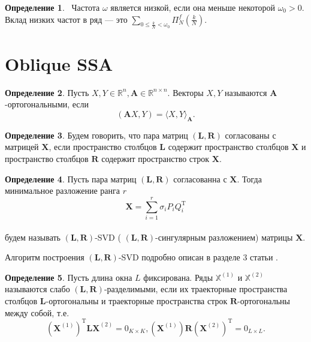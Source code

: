 \documentclass[specialist,
               substylefile = spbu_report.rtx,
               subf,href,colorlinks=true, 12pt]{disser}
\theoremstyle{definition}
\newtheorem{definition}{Определение}
\begin{document}
\begin{definition}
    ~Частота $\omega$ является низкой, если она меньше некоторой $\omega_0 > 0$. Вклад низких частот в ряд --- это $\sum\limits_{0 \leq \frac{k}{N} < \omega_0}\Pi_N^f(\frac{k}{N})$.
\end{definition}

\section{Oblique SSA}

\begin{definition}
    Пусть $X, Y \in \mathbb{R}^n, \mathbf{A} \in \mathbb{R}^{n \times n}$. Векторы $X, Y$ называются $\mathbf{A}$-ортогональными, если
    \begin{equation*}
        (\mathbf{A}X, Y) =  \langle X, Y\rangle _{\mathbf{A}}.
    \end{equation*}
\end{definition}
\begin{definition}
    Будем говорить, что пара матриц $(\mathbf{L}, \mathbf{R})$ согласованы с матрицей $\mathbf{X}$, если пространство столбцов $\mathbf{L}$ содержит пространство столбцов $\mathbf{X}$ и пространство столбцов $\mathbf{R}$ содержит пространство строк $\mathbf{X}$.
\end{definition}
\begin{definition}
    Пусть пара матриц $(\mathbf{L}, \mathbf{R})$ согласованна с $\mathbf{X}$. Тогда минимальное разложение ранга $r$
    \begin{equation*}
        \mathbf{X} = \sum_{i = 1}^{r}\sigma_iP_iQ_i^{\mathrm{T}}
    \end{equation*}\\
    будем называть $(\mathbf{L}, \mathbf{R})$-SVD ( $(\mathbf{L}, \mathbf{R})$-сингулярным разложением) матрицы $\mathbf{X}$.
\end{definition}

Алгоритм построения $(\mathbf{L}, \mathbf{R})$-SVD подробно описан в разделе 3 статьи \cite{Golyandina15}.

\begin{definition}
    Пусть длина окна $L$ фиксирована. Ряды $\mathbb{X}^{(1)}$ и $\mathbb{X}^{(2)}$ называются слабо $(\mathbf{L}, \mathbf{R})$-разделимыми, если их траекторные пространства столбцов $\mathbf{L}$-ортогональны и траекторные пространства строк $\mathbf{R}$-ортогональны между собой, т.е.
    \begin{equation*}
        (\mathbf{X}^{(1)})^{\mathrm{T}}\mathbf{LX}^{(2)} = 0_{K \times K}, (\mathbf{X}^{(1)})\mathbf{R}(\mathbf{X}^{(2)})^{\mathrm{T}} = 0_{L \times L}.
    \end{equation*}

\end{definition}
    
\end{document}
